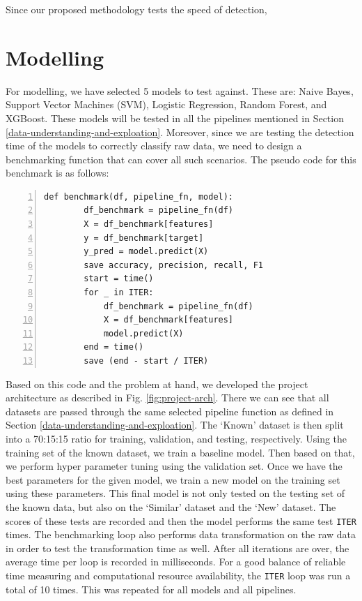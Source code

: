 Since our proposed methodology tests the speed of detection,




\section{Modelling}

For modelling, we have selected 5 models to test against. These are: Naive Bayes, Support Vector Machines (SVM), Logistic Regression, Random Forest, and XGBoost. These models will be tested in all the pipelines mentioned in Section \ref{data-understanding-and-exploation}. Moreover, since we are testing the detection time of the models to correctly classify raw data, we need to design a benchmarking function that can cover all such scenarios. The pseudo code for this benchmark is as follows:
\begin{lstlisting}[numbers=left,numbersep=-2em,frame=lines]
    def benchmark(df, pipeline_fn, model):
        df_benchmark = pipeline_fn(df)
        X = df_benchmark[features]
        y = df_benchmark[target]
        y_pred = model.predict(X)
        save accuracy, precision, recall, F1
        start = time()
        for _ in ITER:
            df_benchmark = pipeline_fn(df)
            X = df_benchmark[features]
            model.predict(X)
        end = time()
        save (end - start / ITER)
\end{lstlisting}

Based on this code and the problem at hand, we developed the project architecture as described in Fig. \ref{fig:project-arch}. There we can see that all datasets are passed through the same selected pipeline function as defined in Section \ref{data-understanding-and-exploation}. The `Known' dataset is then split into a 70:15:15 ratio for training, validation, and testing, respectively. Using the training set of the known dataset, we train a baseline model. Then based on that, we perform hyper parameter tuning using the validation set. Once we have the best parameters for the given model, we train a new model on the training set using these parameters. This final model is not only tested on the testing set of the known data, but also on the `Similar' dataset and the `New' dataset. The scores of these tests are recorded and then the model performs the same test \lstinline{ITER} times. The benchmarking loop also performs data transformation on the raw data in order to test the transformation time as well. After all iterations are over, the average time per loop is recorded in milliseconds. For a good balance of reliable time measuring and computational resource availability, the \lstinline{ITER} loop was run a total of 10 times. This was repeated for all models and all pipelines.

